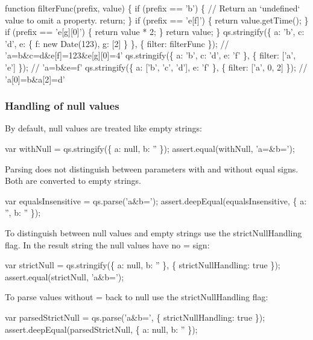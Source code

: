 \begin{DoxyCode}
function filterFunc(prefix, value) \{
  if (prefix == 'b') \{
    // Return an `undefined` value to omit a property.
    return;
  \}
  if (prefix == 'e[f]') \{
    return value.getTime();
  \}
  if (prefix == 'e[g][0]') \{
    return value * 2;
  \}
  return value;
\}
qs.stringify(\{ a: 'b', c: 'd', e: \{ f: new Date(123), g: [2] \} \}, \{ filter: filterFunc \});
// 'a=b&c=d&e[f]=123&e[g][0]=4'
qs.stringify(\{ a: 'b', c: 'd', e: 'f' \}, \{ filter: ['a', 'e'] \});
// 'a=b&e=f'
qs.stringify(\{ a: ['b', 'c', 'd'], e: 'f' \}, \{ filter: ['a', 0, 2] \});
// 'a[0]=b&a[2]=d'
\end{DoxyCode}


\subsubsection*{Handling of {\ttfamily null} values}

By default, {\ttfamily null} values are treated like empty strings\+:


\begin{DoxyCode}
var withNull = qs.stringify(\{ a: null, b: '' \});
assert.equal(withNull, 'a=&b=');
\end{DoxyCode}


Parsing does not distinguish between parameters with and without equal signs. Both are converted to empty strings.


\begin{DoxyCode}
var equalsInsensitive = qs.parse('a&b=');
assert.deepEqual(equalsInsensitive, \{ a: '', b: '' \});
\end{DoxyCode}


To distinguish between {\ttfamily null} values and empty strings use the {\ttfamily strict\+Null\+Handling} flag. In the result string the {\ttfamily null} values have no {\ttfamily =} sign\+:


\begin{DoxyCode}
var strictNull = qs.stringify(\{ a: null, b: '' \}, \{ strictNullHandling: true \});
assert.equal(strictNull, 'a&b=');
\end{DoxyCode}


To parse values without {\ttfamily =} back to {\ttfamily null} use the {\ttfamily strict\+Null\+Handling} flag\+:


\begin{DoxyCode}
var parsedStrictNull = qs.parse('a&b=', \{ strictNullHandling: true \});
assert.deepEqual(parsedStrictNull, \{ a: null, b: '' \});
\end{DoxyCode}


